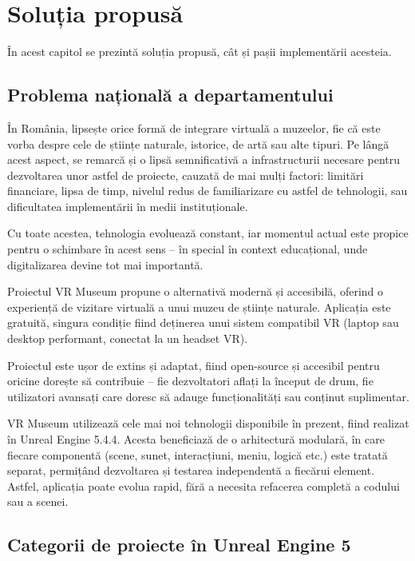 \chapter{Soluția propusă}
\label{cap:cap3}
În acest capitol se prezintă soluția propusă, cât și pașii implementării acesteia.

\section{Problema națională a departamentului}

În România, lipsește orice formă de integrare virtuală a muzeelor, fie că este vorba despre cele de științe naturale, istorice, de artă sau alte tipuri. Pe lângă acest aspect, se remarcă și o lipsă semnificativă a infrastructurii necesare pentru dezvoltarea unor astfel de proiecte, cauzată de mai mulți factori: limitări financiare, lipsa de timp, nivelul redus de familiarizare cu astfel de tehnologii, sau dificultatea implementării în medii instituționale.

Cu toate acestea, tehnologia evoluează constant, iar momentul actual este propice pentru o schimbare în acest sens – în special în context educațional, unde digitalizarea devine tot mai importantă.

Proiectul VR Museum propune o alternativă modernă și accesibilă, oferind o experiență de vizitare virtuală a unui muzeu de științe naturale. Aplicația este gratuită, singura condiție fiind deținerea unui sistem compatibil VR (laptop sau desktop performant, conectat la un headset VR).

Proiectul este ușor de extins și adaptat, fiind open-source și accesibil pentru oricine dorește să contribuie – fie dezvoltatori aflați la început de drum, fie utilizatori avansați care doresc să adauge funcționalități sau conținut suplimentar.

VR Museum utilizează cele mai noi tehnologii disponibile în prezent, fiind realizat în Unreal Engine 5.4.4. Acesta beneficiază de o arhitectură modulară, în care fiecare componentă (scene, sunet, interacțiuni, meniu, logică etc.) este tratată separat, permițând dezvoltarea și testarea independentă a fiecărui element. Astfel, aplicația poate evolua rapid, fără a necesita refacerea completă a codului sau a scenei.

\section{Categorii de proiecte în Unreal Engine 5}

